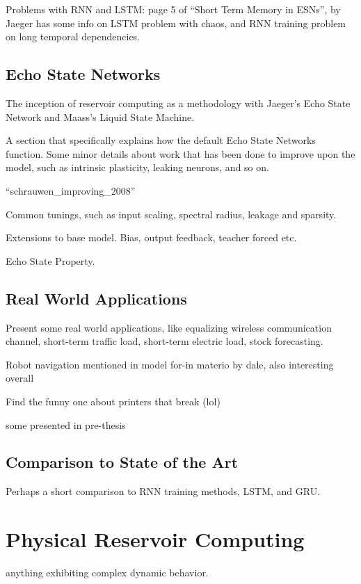 Problems with RNN and LSTM: page 5 of ``Short Term Memory in ESNs'', by Jaeger
has some info on LSTM problem with chaos, and RNN training problem on long
temporal dependencies.

\subsection{Echo State Networks}

The inception of reservoir computing as a methodology with Jaeger's Echo State
Network and Maass's Liquid State Machine.

A section that specifically explains how the default Echo State Networks
function. Some minor details about work that has been done to improve upon the
model, such as intrinsic plasticity, leaking neurons, and so on.

``schrauwen_improving_2008''

Common tunings, such as input scaling, spectral radius, leakage and sparsity.

Extensions to base model. Bias, output feedback, teacher forced etc.

Echo State Property.

\subsection{Real World Applications}

Present some real world applications, like equalizing wireless communication
channel, short-term traffic load, short-term electric load, stock forecasting.

Robot navigation mentioned in model for-in materio by dale, also interesting
overall

Find the funny one about printers that break (lol)

some presented in pre-thesis

\subsection{Comparison to State of the Art}

Perhaps a short comparison to RNN training methods, LSTM, and GRU.

\section{Physical Reservoir Computing}

anything exhibiting complex dynamic behavior.

